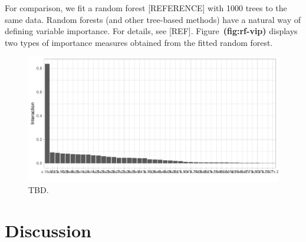\documentclass{article}
\def\ref#1{\textbf{(#1)}}
\begin{document}
For comparison, we fit a random forest [REFERENCE] with 1000 trees to the same data. Random forests (and other tree-based methods) have a natural way of defining variable importance. For details, see [REF]. Figure~\ref{fig:rf-vip} displays two types of importance measures obtained from the fitted random forest.


\begin{figure}[!htb]
  \label{network-int}
  \centering
  \includegraphics[width=1.0\textwidth]{network-int}
  \caption{TBD.}
\end{figure}

\section{Discussion}



\end{document}
